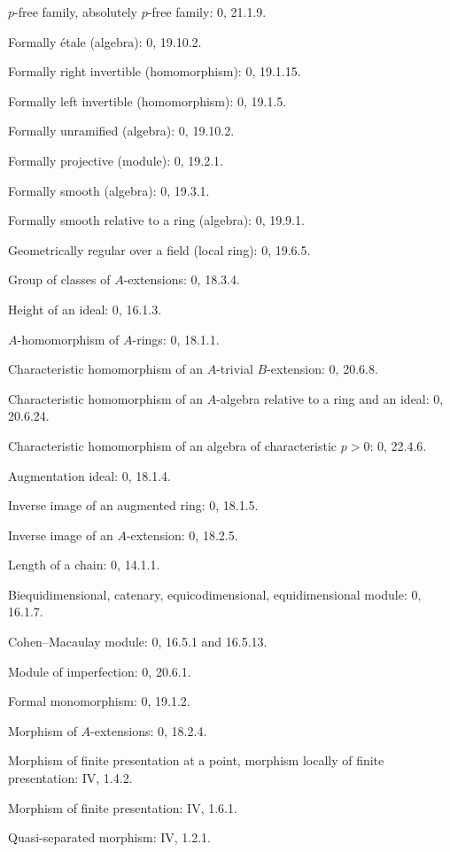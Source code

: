 $p$-free family, absolutely $p$-free family: 0, 21.1.9.\par
Formally étale (algebra): 0, 19.10.2.\par
Formally right invertible (homomorphism): 0, 19.1.15.\par
Formally left invertible (homomorphism): 0, 19.1.5.\par
Formally unramified (algebra): 0, 19.10.2.\par
Formally projective (module): 0, 19.2.1.\par
Formally smooth (algebra): 0, 19.3.1.\par
Formally smooth relative to a ring (algebra): 0, 19.9.1.\par

Geometrically regular over a field (local ring): 0, 19.6.5.\par
Group of classes of $A$-extensions: 0, 18.3.4.\par

Height of an ideal: 0, 16.1.3.\par
$A$-homomorphism of $A$-rings: 0, 18.1.1.\par
Characteristic homomorphism of an $A$-trivial $B$-extension: 0, 20.6.8.\par
Characteristic homomorphism of an $A$-algebra relative to a ring and an ideal: 0, 20.6.24.\par
Characteristic homomorphism of an algebra of characteristic $p>0$: 0, 22.4.6.\par

Augmentation ideal: 0, 18.1.4.\par
Inverse image of an augmented ring: 0, 18.1.5.\par
Inverse image of an $A$-extension: 0, 18.2.5.\par

Length of a chain: 0, 14.1.1.\par

Biequidimensional, catenary, equicodimensional, equidimensional module: 0, 16.1.7.\par
Cohen--Macaulay module: 0, 16.5.1 and 16.5.13.\par
Module of imperfection: 0, 20.6.1.\par
Formal monomorphism: 0, 19.1.2.\par
Morphism of $A$-extensions: 0, 18.2.4.\par
Morphism of finite presentation at a point, morphism locally of finite presentation: IV, 1.4.2.\par
Morphism of finite presentation: IV, 1.6.1.\par
Quasi-separated morphism: IV, 1.2.1.\par

